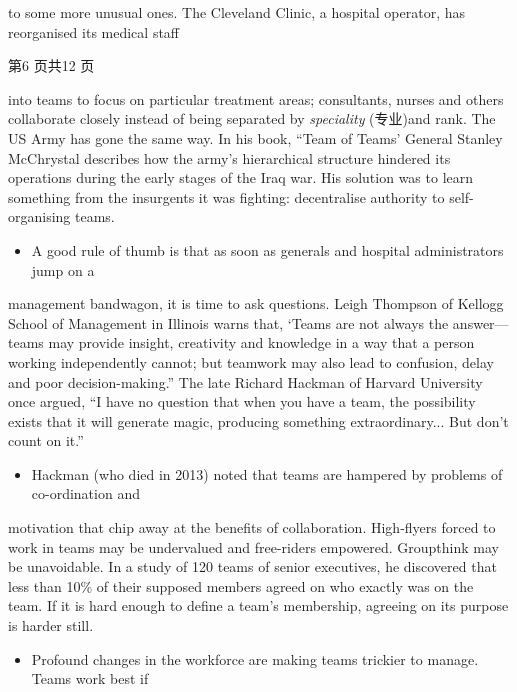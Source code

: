 \documentclass[UTF8,11pt]{ctexart}
\begin{document}
to some more unusual ones. The Cleveland Clinic, a hospital operator, has reorganised its medical staff


第6 页共12 页


into teams to focus on particular treatment areas; consultants, nurses and others collaborate closely instead of being separated by\textit{ speciality} (专业)and rank. The US Army has gone the same way. In his book, “Team of Teams' General Stanley McChrystal describes how the army’s hierarchical structure hindered its operations during the early stages of the Iraq war. His solution was to learn something from the insurgents it was fighting: decentralise authority to self-organising teams.


\begin{itemize}[leftmargin=2em,itemsep=.2em,topsep=.4em]\item[E.] A good rule of thumb is that as soon as generals and hospital administrators jump on a
\end{itemize}

management bandwagon, it is time to ask questions. Leigh Thompson of Kellogg School of Management in Illinois warns that, ‘Teams are not always the answer—teams may provide insight, creativity and knowledge in a way that a person working independently cannot; but teamwork may also lead to confusion, delay and poor decision-making.” The late Richard Hackman of Harvard University once argued, “I have no question that when you have a team, the possibility exists that it will generate magic, producing something extraordinary... But don’t count on it.”


\begin{itemize}[leftmargin=2em,itemsep=.2em,topsep=.4em]\item[F.] Hackman (who died in 2013) noted that teams are hampered by problems of co-ordination and
\end{itemize}

motivation that chip away at the benefits of collaboration. High-flyers forced to work in teams may be undervalued and free-riders empowered. Groupthink may be unavoidable. In a study of 120 teams of senior executives, he discovered that less than 10\% of their supposed members agreed on who exactly was on the team. If it is hard enough to define a team’s membership, agreeing on its purpose is harder still.


\begin{itemize}[leftmargin=2em,itemsep=.2em,topsep=.4em]\item[G.] Profound changes in the workforce are making teams trickier to manage. Teams work best if
\end{itemize}
\end{document}
